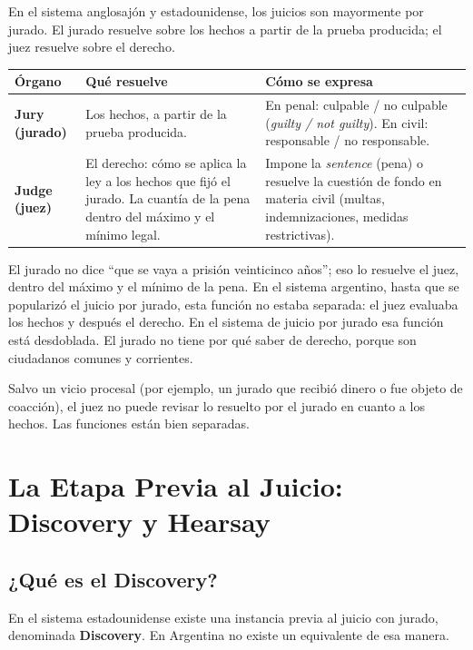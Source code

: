 \documentclass[12pt,oneside]{book}
\begin{document}
En el sistema anglosajón y estadounidense, los juicios son mayormente por jurado. El jurado resuelve sobre los hechos a partir de la prueba producida; el juez resuelve sobre el derecho.

\begin{table}[H]
\centering
\begin{tabularx}{\textwidth}{p{2.5cm} X X}
\toprule
\textbf{Órgano} & \textbf{Qué resuelve} & \textbf{Cómo se expresa} \\
\midrule
\textbf{Jury (jurado)} & Los hechos, a partir de la prueba producida. & En penal: culpable / no culpable (\textit{guilty / not guilty}). En civil: responsable / no responsable. \\
\midrule
\textbf{Judge (juez)} & El derecho: cómo se aplica la ley a los hechos que fijó el jurado. La cuantía de la pena dentro del máximo y el mínimo legal. & Impone la \textit{sentence} (pena) o resuelve la cuestión de fondo en materia civil (multas, indemnizaciones, medidas restrictivas). \\
\bottomrule
\end{tabularx}
\end{table}

\begin{note}
El jurado no dice ``que se vaya a prisión veinticinco años''; eso lo resuelve el juez, dentro del máximo y el mínimo de la pena. En el sistema argentino, hasta que se popularizó el juicio por jurado, esta función no estaba separada: el juez evaluaba los hechos y después el derecho. En el sistema de juicio por jurado esa función está desdoblada. El jurado no tiene por qué saber de derecho, porque son ciudadanos comunes y corrientes.
\end{note}

Salvo un vicio procesal (por ejemplo, un jurado que recibió dinero o fue objeto de coacción), el juez no puede revisar lo resuelto por el jurado en cuanto a los hechos. Las funciones están bien separadas.

\section{La Etapa Previa al Juicio: Discovery y Hearsay}

\subsection{¿Qué es el Discovery?}

En el sistema estadounidense existe una instancia previa al juicio con jurado, denominada \textbf{Discovery}. En Argentina no existe un equivalente de esa manera.
\end{document}
